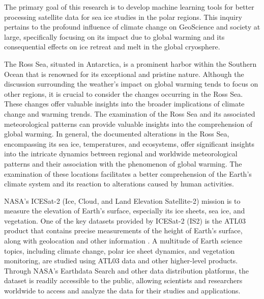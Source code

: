 
The primary goal of this research is to develop machine learning tools for better processing satellite data for sea ice studies in the polar regions. This inquiry pertains to the profound influence of climate change on GeoScience and society at large, specifically focusing on its impact due to global warming and its consequential effects on ice retreat and melt in the global cryosphere. 


The Ross Sea, situated in Antarctica, is a prominent harbor within the Southern Ocean that is renowned for its exceptional and pristine nature. Although the discussion surrounding the weather's impact on global warming tends to focus on other regions, it is crucial to consider the changes occurring in the Ross Sea. These changes offer valuable insights into the broader implications of climate change and warming trends. The examination of the Ross Sea and its associated meteorological patterns can provide valuable insights into the comprehension of global warming. In general, the documented alterations in the Ross Sea, encompassing its sea ice, temperatures, and ecosystems, offer significant insights into the intricate dynamics between regional and worldwide meteorological patterns and their association with the phenomenon of global warming. The examination of these locations facilitates a better comprehension of the Earth's climate system and its reaction to alterations caused by human activities.


NASA's ICESat-2 (Ice, Cloud, and Land Elevation Satellite-2) mission is to measure the elevation of Earth's surface, especially its ice sheets, sea ice, and vegetation. One of the key datasets provided by ICESat-2 (IS2) is the ATL03 product that contains precise measurements of the height of Earth's surface, along with geolocation and other information \cite{neumann2019ice}. 
A multitude of Earth science topics, including climate change, polar ice sheet dynamics, and vegetation monitoring, are studied using ATL03 data and other higher-level products. Through NASA's Earthdata Search and other data distribution platforms, the dataset is readily accessible to the public, allowing scientists and researchers worldwide to access and analyze the data for their studies and applications.

